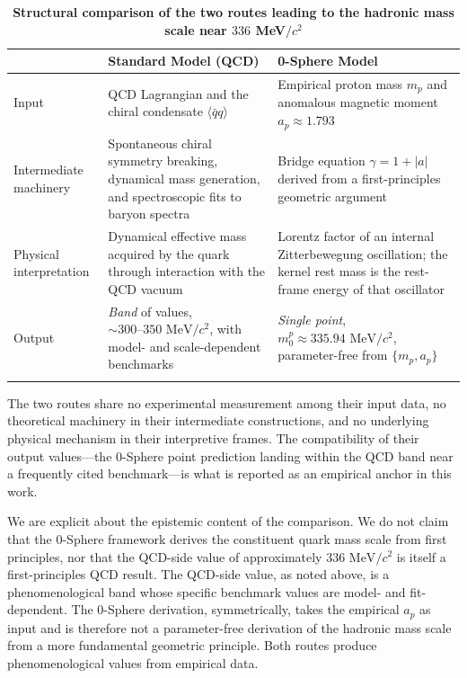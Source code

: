 \documentclass[%
 reprint, amsmath,amssymb, aps, prc, ]{revtex4-2}
\numberwithin{equation}{section}
\begin{document}
\begin{table}[t!]
\centering
\caption{\textbf{Structural comparison of the two routes leading to the hadronic mass scale near $336$ MeV$/c^2$}}
\label{tab:reading_aid}
\renewcommand{\arraystretch}{1.4}
\begin{tabular}{p{3.5cm}p{5.8cm}p{5.8cm}}
\toprule
& \textbf{Standard Model (QCD)}
& \textbf{0-Sphere Model} \\
\midrule
Input
& QCD Lagrangian and the chiral condensate $\langle\bar{q}q\rangle$
& Empirical proton mass $m_p$ and anomalous magnetic moment $a_p \approx 1.793$ \\
\addlinespace[0.3cm]
Intermediate machinery
& Spontaneous chiral symmetry breaking, dynamical mass generation, and spectroscopic fits to baryon spectra
& Bridge equation $\gamma = 1 + |a|$ derived from a first-principles geometric argument \\
\addlinespace[0.3cm]
Physical interpretation
& Dynamical effective mass acquired by the quark through interaction with the QCD vacuum
& Lorentz factor of an internal Zitterbewegung oscillation; the kernel rest mass is the rest-frame energy of that oscillator \\
\addlinespace[0.3cm]
Output
& \emph{Band} of values, $\sim 300\text{--}350 \text{ MeV}/c^2$, with model- and scale-dependent benchmarks
& \emph{Single point}, $m_0^p \approx 335.94 \text{ MeV}/c^2$, parameter-free from $\{m_p, a_p\}$ \\
\addlinespace[0.2cm]
\bottomrule
\end{tabular}
\vspace{0.2cm}
\begin{minipage}{0.95\textwidth}
\justifying\footnotesize
The two routes share no experimental measurement among their input data, no theoretical machinery in their intermediate constructions, and no underlying physical mechanism in their interpretive frames. The compatibility of their output values---the 0-Sphere point prediction landing within the QCD band near a frequently cited benchmark---is what is reported as an empirical anchor in this work.
\end{minipage}
\end{table}

We are explicit about the epistemic content of the comparison.
We do not claim that the 0-Sphere framework derives the constituent quark mass scale from first principles, nor that the QCD-side value of approximately $336 \text{ MeV}/c^2$ is itself a first-principles QCD result.
The QCD-side value, as noted above, is a phenomenological band whose specific benchmark values are model- and fit-dependent.
The 0-Sphere derivation, symmetrically, takes the empirical $a_p$ as input and is therefore not a parameter-free derivation of the hadronic mass scale from a more fundamental geometric principle.
Both routes produce phenomenological values from empirical data.
\end{document}
